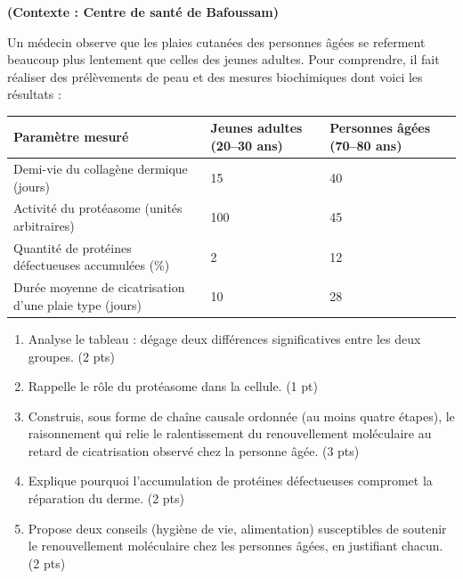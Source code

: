 \documentclass[11pt]{article}
\begin{document}
\begin{exercice}
\textbf{(Contexte : Centre de santé de Bafoussam)}

Un médecin observe que les plaies cutanées des personnes âgées se referment beaucoup plus lentement que celles des jeunes adultes. Pour comprendre, il fait réaliser des prélèvements de peau et des mesures biochimiques dont voici les résultats :

\begin{center}
\begin{tabularx}{\linewidth}{|X|X|X|}
\hline
\rowcolor{popblueL} Paramètre mesuré & Jeunes adultes (20--30 ans) & Personnes âgées (70--80 ans) \\
\hline
Demi-vie du collagène dermique (jours) & 15 & 40 \\
\hline
Activité du protéasome (unités arbitraires) & 100 & 45 \\
\hline
Quantité de protéines défectueuses accumulées (\%) & 2 & 12 \\
\hline
Durée moyenne de cicatrisation d'une plaie type (jours) & 10 & 28 \\
\hline
\end{tabularx}
\end{center}

\begin{enumerate}
\item Analyse le tableau : dégage deux différences significatives entre les deux groupes. \hfill (2 pts)
\item Rappelle le rôle du protéasome dans la cellule. \hfill (1 pt)
\item Construis, sous forme de chaîne causale ordonnée (au moins quatre étapes), le raisonnement qui relie le ralentissement du renouvellement moléculaire au retard de cicatrisation observé chez la personne âgée. \hfill (3 pts)
\item Explique pourquoi l'accumulation de protéines défectueuses compromet la réparation du derme. \hfill (2 pts)
\item Propose deux conseils (hygiène de vie, alimentation) susceptibles de soutenir le renouvellement moléculaire chez les personnes âgées, en justifiant chacun. \hfill (2 pts)
\end{enumerate}
\end{exercice}
\end{document}
